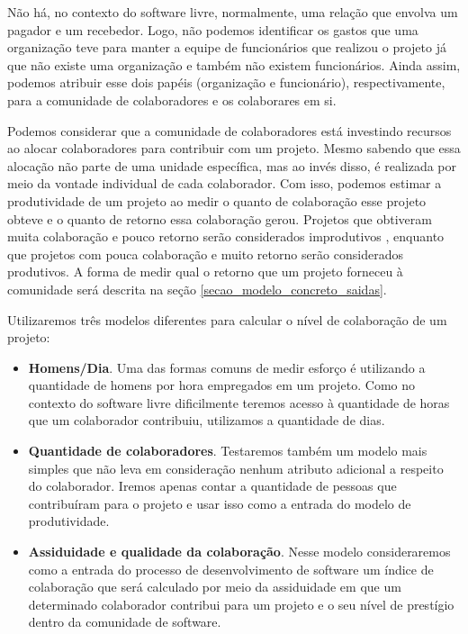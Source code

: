 Não há, no contexto do software livre, normalmente, uma relação que envolva um pagador e um recebedor. Logo, não podemos identificar os gastos que uma organização teve para manter a equipe de funcionários que realizou o projeto já que não existe uma organização e também não existem funcionários. Ainda assim, podemos atribuir esse dois papéis (organização e funcionário), respectivamente,  para a comunidade de colaboradores e os colaborares em si. 

Podemos considerar que a comunidade de colaboradores está investindo recursos ao alocar colaboradores para contribuir com um projeto. Mesmo sabendo que essa alocação não parte de uma unidade específica, mas ao invés disso, é realizada por meio da vontade individual de cada colaborador. Com isso, podemos estimar a produtividade de um projeto ao medir o quanto de colaboração esse projeto obteve e o quanto de retorno essa colaboração gerou. Projetos que obtiveram muita colaboração e pouco retorno serão considerados improdutivos , enquanto que projetos com pouca colaboração e muito retorno serão considerados produtivos. A forma de medir qual o retorno que um projeto forneceu à comunidade será descrita na seção \ref{secao_modelo_concreto_saidas}.

Utilizaremos três modelos diferentes para calcular o nível de colaboração de um projeto:

\begin{itemize}

\item \textbf{Homens/Dia}. Uma das formas comuns de medir esforço é utilizando a quantidade de homens por hora empregados em um projeto. Como no contexto do software livre dificilmente teremos acesso à quantidade de horas que um colaborador contribuiu, utilizamos a quantidade de dias. 

\item \textbf{Quantidade de colaboradores}. Testaremos também um modelo mais simples que não leva em consideração nenhum atributo adicional a respeito do colaborador. Iremos apenas contar a quantidade de pessoas que contribuíram para o projeto e usar isso como a entrada do modelo de produtividade.
\item \textbf{Assiduidade e qualidade da colaboração}. Nesse modelo consideraremos como a entrada do processo de desenvolvimento de software um índice de colaboração que será calculado por meio da assiduidade em que um determinado colaborador contribui para um projeto e o seu nível de prestígio dentro da comunidade de software. 
\end{itemize}

